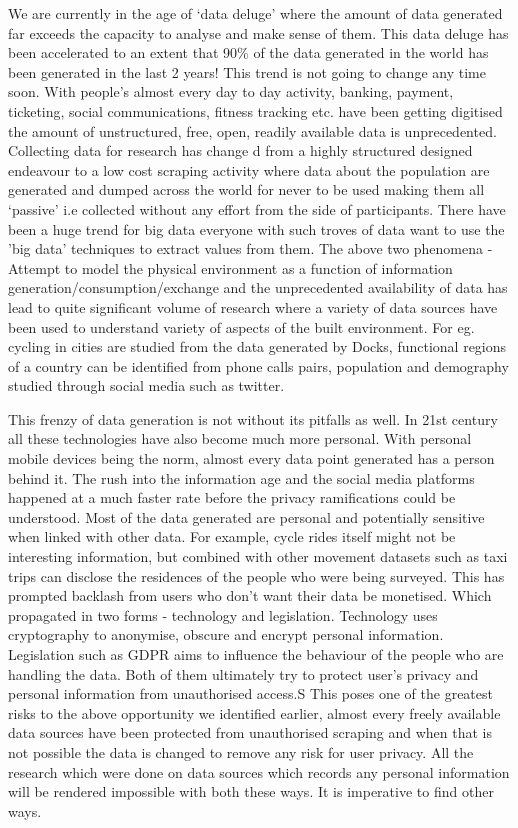 We are currently in the age of `data deluge' where the amount of data generated far exceeds the capacity to analyse and make sense of them.
This data deluge has been accelerated to an extent that 90\% of the data generated in the world has been generated in the last 2 years!
This trend is not going to change any time soon.
With people's almost every day to day activity, banking, payment, ticketing, social communications, fitness tracking etc. have been getting digitised the amount of unstructured, free, open, readily available data is unprecedented.
Collecting data for research has change d from a highly structured designed endeavour to  a low cost scraping activity where data about the population are generated and dumped across the world for never to be used making them all `passive' i.e collected without any effort from the side of participants.
There have been a huge trend for big data everyone with such troves of data want to use the 'big data' techniques to extract values from them.
The above two phenomena - Attempt to model the physical environment as a function of information generation/consumption/exchange and the unprecedented availability of data has lead to quite significant volume of research where a variety of data sources have been used to understand variety of aspects of the built environment.
For eg. cycling in cities are studied from the data generated by Docks, functional regions of a country can be identified from phone calls pairs, population and demography studied through social media such as twitter. 

This frenzy of data generation is not without its pitfalls as well. 
In 21st century all these technologies have also become much more personal.
With personal mobile devices being the norm, almost every data point generated has a person behind it.
The rush into the information age and the social media platforms happened at a much faster rate before the privacy ramifications could be understood.
Most of the data generated are personal and potentially sensitive when linked with other data.
For example, cycle rides itself might not be interesting information, but combined with other movement datasets such as taxi trips can disclose the residences of the people who were being surveyed.
This has prompted backlash from users who don't want their data be monetised.
Which propagated in two forms - technology and legislation.
Technology uses cryptography to anonymise, obscure and encrypt personal information. Legislation such as GDPR aims to influence the behaviour of the people who are handling the data. 
Both of them ultimately try to protect user's privacy and personal information from unauthorised access.S
This poses one of the  greatest risks to the above opportunity we identified earlier, almost every freely available data sources have been protected from unauthorised scraping and when that is not possible the data is changed to remove any risk for user privacy.
All the research which were done on data sources which records any personal information will be rendered impossible with both these ways.
It is imperative to find other ways.

